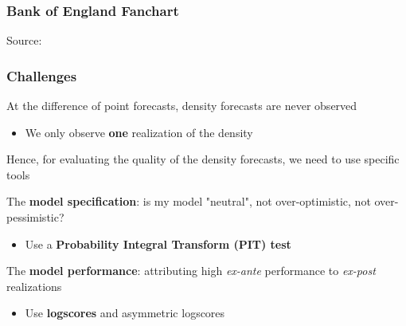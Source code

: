 \documentclass{beamer}
\newenvironment{wideitemize}{\itemize\addtolength{\itemsep}{10pt}}{\enditemize}
\begin{document}
\begin{frame}
  \frametitle{Bank of England Fanchart}
  \hspace*{15pt}\hbox{\scriptsize Source:}
\end{frame}






\begin{frame}
  \frametitle{Challenges}
  \begin{wideitemize}
  \item At the difference of point forecasts, density forecasts are never observed
    \begin{itemize}
    \item We only observe \textbf{one} realization of the density
    \end{itemize}
  \item Hence, for evaluating the quality of the density forecasts, we need to use specific tools
   \item The \textbf{model specification}: is my model "neutral", not over-optimistic, not over-pessimistic?
      \begin{itemize}
      \item Use a \textbf{Probability Integral Transform (PIT) test}
      \end{itemize}      
    \item The \textbf{model performance}: attributing high \emph{ex-ante} performance to \emph{ex-post} realizations
      \begin{itemize}
      \item Use \textbf{logscores} and asymmetric logscores
      \end{itemize}
  \end{wideitemize}
\end{frame}
\end{document}
